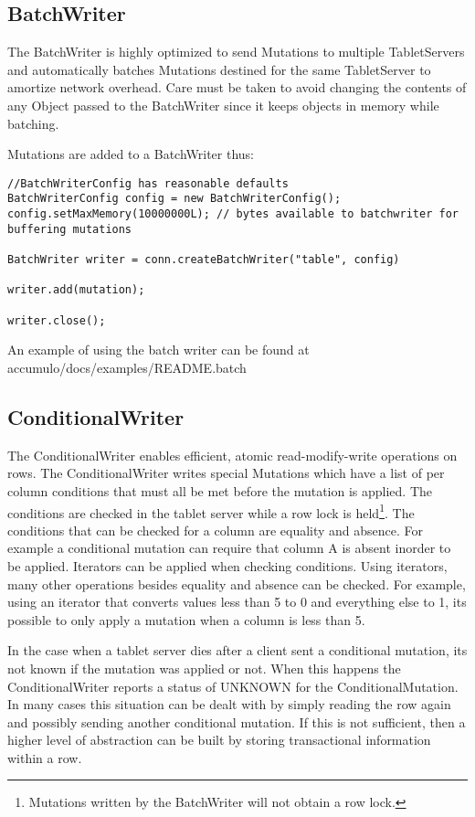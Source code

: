 \subsection{BatchWriter}
The BatchWriter is highly optimized to send Mutations to multiple TabletServers
and automatically batches Mutations destined for the same TabletServer to
amortize network overhead. Care must be taken to avoid changing the contents of
any Object passed to the BatchWriter since it keeps objects in memory while
batching.

Mutations are added to a BatchWriter thus:

\begingroup\fontsize{8pt}{8pt}\selectfont\begin{verbatim}
//BatchWriterConfig has reasonable defaults
BatchWriterConfig config = new BatchWriterConfig();
config.setMaxMemory(10000000L); // bytes available to batchwriter for buffering mutations

BatchWriter writer = conn.createBatchWriter("table", config)

writer.add(mutation);

writer.close();
\end{verbatim}\endgroup

An example of using the batch writer can be found at\\
accumulo/docs/examples/README.batch

\subsection{ConditionalWriter} 
The ConditionalWriter enables efficient, atomic read-modify-write operations on
rows.  The ConditionalWriter writes special Mutations which have a list of per
column conditions that must all be met before the mutation is applied.  The
conditions are checked in the tablet server while a row lock is
held\footnote{Mutations written by the BatchWriter will not obtain a row
lock.}.  The conditions that can be checked for a column are equality and
absence.  For example a conditional mutation can require that column A is
absent inorder to be applied.  Iterators can be applied when checking
conditions.  Using iterators, many other operations besides equality and
absence can be checked.  For example, using an iterator that converts values
less than 5 to 0 and everything else to 1, its possible to only apply a
mutation when a column is less than 5.

In the case when a tablet server dies after a client sent a conditional
mutation, its not known if the mutation was applied or not.  When this happens
the ConditionalWriter reports a status of UNKNOWN for the ConditionalMutation.
In many cases this situation can be dealt with by simply reading the row again
and possibly sending another conditional mutation.  If this is not sufficient,
then a higher level of abstraction can be built by storing transactional
information within a row.
 

